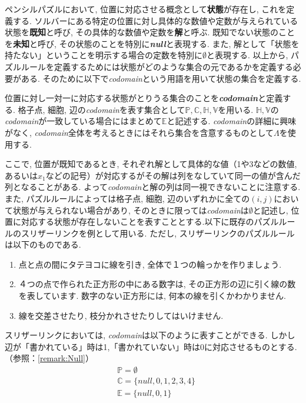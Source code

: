 ペンシルパズルにおいて, 位置に対応させる概念として\textbf{状態}が存在し, これを定義する. ソルバーにある特定の位置に対し具体的な数値や定数が与えられている状態を\textbf{既知}と呼び, その具体的な数値や定数を\textbf{解}と呼ぶ. 既知でない状態のことを\textbf{未知}と呼び, その状態のことを特別に\textbf{\textit{null}}と表現する. また, 解として「状態を持たない」ということを明示する場合の定数を特別に\textbf{$\emptyset$}と表現する.
以上から, パズルルールを定義するためには状態がどのような集合の元であるかを定義する必要がある. そのために以下で\textit{codomain}という用語を用いて状態の集合を定義する.

\begin{definition}\label{definition:Codomain}
  位置に対し一対一に対応する状態がとりうる集合のことを\textbf{\textit{codomain}}と定義する. 格子点, 細胞, 辺の\textit{codomain}を表す集合として$\mathbb{P},\mathbb{C},\mathbb{H},\mathbb{V}$を用いる. $\mathbb{H},\mathbb{V}$の\textit{codomain}が一致している場合にはまとめて$\mathbb{E}$と記述する. \textit{codomain}の詳細に興味がなく, \textit{codomain}全体を考えるときにはそれら集合を含意するものとして$\Lambda$を使用する.
\end{definition}

ここで, 位置が既知であるとき, それぞれ解として具体的な値（1や3などの数値, あるいは$x_1$などの記号）が対応するがその解は列をなしていて同一の値が含んだ列となることがある.
よって\textit{codomain}と解の列は同一視できないことに注意する. また, パズルルールによっては格子点, 細胞, 辺のいずれかに全ての$(i,j)$において状態が与えられない場合があり, そのときに限っては\textit{codomain}は$\emptyset$と記述し, 位置に対応する状態が存在しないことを表すこととする.以下に既存のパズルルールのスリザーリンクを例として用いる. ただし, スリザーリンクのパズルルールは以下のものである. \cite{web:SlitherLink}

\begin{enumerate}
  \item 点と点の間にタテヨコに線を引き, 全体で１つの輪っかを作りましょう.
  \item ４つの点で作られた正方形の中にある数字は, その正方形の辺に引く線の数を表しています. 数字のない正方形には, 何本の線を引くかわかりません.
  \item 線を交差させたり, 枝分かれさせたりしてはいけません.
\end{enumerate}



\begin{example}\label{example:SlitherLinkCodomain}
  スリザーリンクにおいては, \textit{codomain}は以下のように表すことができる. しかし辺が「書かれている」時は1,「書かれていない」時は0に対応させるものとする. （参照：\cref{remark:Null}）
  \begin{align}
     & \mathbb{P}  =  \emptyset                   \\
     & \mathbb{C}  =  \{\textit{null},0,1,2,3,4\} \\
     & \mathbb{E}  =  \{\textit{null},0,1\}
  \end{align}
\end{example}



